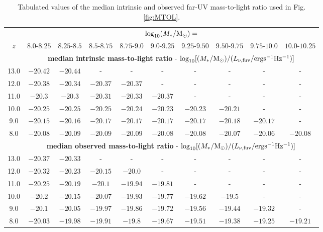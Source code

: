 \begin{table*}
\caption{Tabulated values of the median intrinsic and observed far-UV mass-to-light ratio used in Fig. \ref{fig:MTOL}.}
\label{tab:MTOL}
\begin{tabular}{cccccccccc}
\hline
    & \multicolumn{9}{c}{$\log_{10}(M_*/{\rm M_{\odot}})=$} \\
$z$ & $8.0$-$8.25$ & $8.25$-$8.5$ & $8.5$-$8.75$ & $8.75$-$9.0$ & $9.0$-$9.25$ & $9.25$-$9.50$ & $9.50$-$9.75$ & $9.75$-$10.0$ & $10.0$-$10.25$ \\
\hline
    & \multicolumn{9}{c}{{\bf median intrinsic mass-to-light ratio} -  $\log_{10}[(M_{*}/{\rm M_{\odot}})/(L_{\nu, {\rm fuv}}/{\rm erg s^{-1} Hz^{-1}})]$} \\
\hline
 13.0 & $ -20.42 $  & $ -20.44 $  & - & - & - & - & - & - & -\\
 12.0 & $ -20.38 $  & $ -20.34 $  & $ -20.37 $  & $ -20.37 $  & - & - & - & - & -\\
 11.0 & $ -20.3 $  & $ -20.3 $  & $ -20.31 $  & $ -20.33 $  & $ -20.37 $  & - & - & - & -\\
 10.0 & $ -20.25 $  & $ -20.25 $  & $ -20.25 $  & $ -20.24 $  & $ -20.23 $  & $ -20.23 $  & $ -20.21 $  & - & -\\
 9.0 & $ -20.15 $  & $ -20.16 $  & $ -20.17 $  & $ -20.17 $  & $ -20.17 $  & $ -20.17 $  & $ -20.18 $  & $ -20.17 $  & -\\
 8.0 & $ -20.08 $  & $ -20.09 $  & $ -20.09 $  & $ -20.09 $  & $ -20.08 $  & $ -20.08 $  & $ -20.07 $  & $ -20.06 $  & $ -20.08 $ \\
\hline
    & \multicolumn{9}{c}{{\bf median observed mass-to-light ratio} -  $\log_{10}[(M_{*}/{\rm M_{\odot}})/(L_{\nu, {\rm fuv}}/{\rm erg s^{-1} Hz^{-1}})]$} \\
\hline
 13.0 & $-20.37 $  & $-20.33 $  & - & - & - & - & - & - & -\\
 12.0 & $-20.32 $  & $-20.23 $  & $-20.15 $  & $-20.0 $  & - & - & - & - & -\\
 11.0 & $-20.25 $  & $-20.19 $  & $-20.1 $  & $-19.94 $  & $-19.81 $  & - & - & - & -\\
 10.0 & $-20.2 $  & $-20.15 $  & $-20.07 $  & $-19.93 $  & $-19.77 $  & $-19.62 $  & $-19.5 $  & - & -\\
 9.0 & $-20.1 $  & $-20.05 $  & $-19.97 $  & $-19.86 $  & $-19.72 $  & $-19.56 $  & $-19.44 $  & $-19.32 $  & -\\
 8.0 & $-20.03 $  & $-19.98 $  & $-19.91 $  & $-19.8 $  & $-19.67 $  & $-19.51 $  & $-19.38 $  & $-19.25 $  & $-19.21 $ \\
\hline
\end{tabular}
\end{table*}





